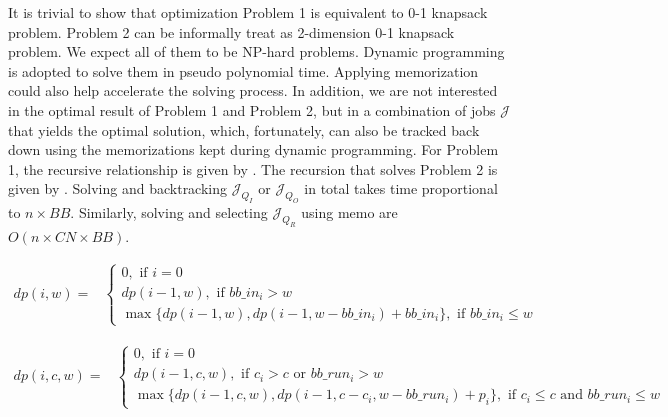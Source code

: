It is trivial to show that optimization Problem 1
is equivalent to 0-1 knapsack problem.
Problem 2 can be informally treat as 2-dimension 0-1 knapsack problem.
We expect all of them to be NP-hard problems.
Dynamic programming is adopted to solve them in pseudo polynomial time.
Applying memorization could also help accelerate the solving process.
In addition, we are not interested in the optimal result of
Problem 1 and Problem 2,
but in a combination of jobs $\mathcal{J}$ that yields the optimal solution,
which, fortunately, can also be tracked back down
using the memorizations kept during dynamic programming.
For Problem 1, the recursive relationship is
given by .
The recursion that solves Problem 2 is given by .
Solving  and
backtracking $\mathcal{J}_{Q_I}$ or $\mathcal{J}_{Q_O}$ in total takes time proportional to $n\times BB$.
Similarly, solving  and selecting $\mathcal{J}_{Q_R}$ using memo
are $O(n\times CN\times BB)$.


\begin{strip}
        \begin{align}
                dp(i, w) = & 
                \left\{
                        \begin{array}{l}
                                0, \text{ if $i=0$ } \\ [0.6em]
                                dp(i-1, w), \text{ if $bb\_in_i > w$} \\ [0.6em]
                                \max \{ dp(i-1, w), dp(i-1, w-bb\_in_i) + bb\_in_i \}, \text{ if $bb\_in_i \leq w$}
                        \end{array} 
                \right.
                \label{Equ:MaxTransferDataRecursion} 
        \end{align}
\end{strip}

\begin{strip}
        \begin{align}
                dp(i, c, w) = &
                \left\{
                        \begin{array}{l}
                                0, \text{ if $i=0$ } \\ [0.6em]
                                dp(i-1, c, w), \text{ if $c_i > c$ or $bb\_run_i > w$} \\ [0.6em]
                                \max \{ dp(i-1, c, w), dp(i-1, c - c_i, w - bb\_run_i) + p_i \}, \text{ if $c_i \leq c$ and $bb\_run_i \leq w$}
                        \end{array} 
                \right.
                \label{Equ:MaxProductRecursion}
        \end{align}
\end{strip}


